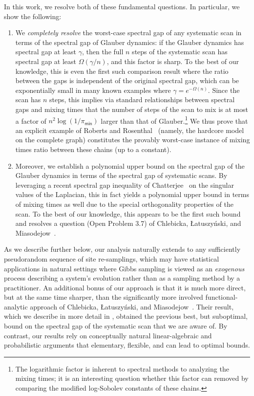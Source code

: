 \documentclass[11pt]{article}
\begin{document}
In this work, we resolve both of these fundamental questions. In particular, we show the following:
\begin{enumerate}
    \item We \emph{completely resolve} the worst-case spectral gap of any systematic scan in terms of the spectral gap of Glauber dynamics: if the Glauber dynamics has spectral gap at least $\gamma$, then the full $n$ steps of the systematic scan has spectral gap at least $\Omega(\gamma/n)$, and this factor is sharp. To the best of our knowledge, this is even the first such comparison result where the ratio between the gaps 
    is independent of the original spectral gap, which can be exponentially small in many known examples where $\gamma = e^{-\Omega(n)}$. Since the scan has $n$ steps, this implies via standard relationships between spectral gaps and mixing times that the number of steps of the scan to mix is at most a factor of $n^2\log(1/\pi_{\mathsf{min}})$ larger than that of Glauber.\footnote{The logarithmic factor is inherent to spectral methods to analyzing the mixing times; it is an interesting question whether this factor can removed by comparing the modified log-Sobolev constants of these chains.} We thus prove that an explicit example of Roberts and Rosenthal~\cite{roberts2015surprising} (namely, the hardcore model on the complete graph) constitutes the provably worst-case instance of mixing times ratio between these chains (up to a constant).  
    \item Moreover, we establish a polynomial upper bound on the spectral gap of the Glauber dynamics in terms of the spectral gap of systematic scans. By leveraging a recent spectral gap inequality of Chatterjee~\cite{chatterjee2023spectral} on the singular values of the Laplacian, this in fact yields a polynomial upper bound in terms of mixing times as well due to the special orthogonality properties of the scan. To the best of our knowledge, this appears to be the first such bound and resolves a question (Open Problem 3.7) of Chlebicka,  Łatuszy\'nski, and Miasodejow~\cite{chlebicka}.
\end{enumerate}
As we describe further below, our analysis naturally extends to any sufficiently pseudorandom sequence of site re-samplings, which may have statistical applications in natural settings where Gibbs sampling is viewed as an \emph{exogenous} process describing a system's evolution rather than as a sampling method by a practitioner. An additional bonus of our approach is that it is much more direct, but at the same time sharper, than the significantly more involved functional-analytic approach of Chlebicka,  Łatuszy\'nski, and Miasodejow~\cite{chlebicka}. Their result, which we describe in more detail in , obtained the previous best, but suboptimal, bound on the spectral gap of the systematic scan that we are aware of. By contrast, our results rely on conceptually natural linear-algebraic and probabilistic arguments that elementary, flexible, and can lead to optimal bounds.
\end{document}
